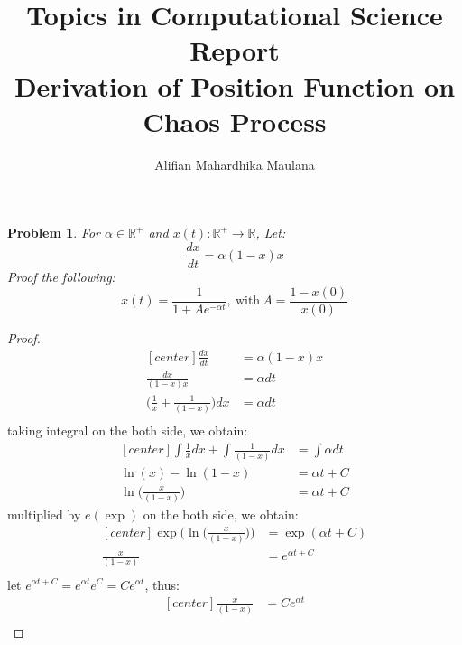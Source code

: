 \documentclass[a4paper,9pt]{article}
\title{Topics in Computational Science Report \\ Derivation of Position Function on Chaos Process}
\author{Alifian Mahardhika Maulana}
\newtheorem{prob}{Problem}
\newcommand{\R}{\mathbb{R}}
\begin{document}
\maketitle
\begin{prob}
	For $\alpha \in \R^+$ and $x(t) : \R^+ \rightarrow \R$, Let:
	\begin{equation}
	\frac{dx}{dt} = \alpha(1-x)x
	\end{equation}
	Proof the following:
	\begin{equation*}
	x(t) = \frac{1}{1+Ae^{-\alpha t}},\ \text{with}\ A=\frac{1-x(0)}{x(0)}
	\end{equation*}
\end{prob}
\begin{proof}
	\begin{equation*}
	\begin{aligned}[center]
		\frac{dx}{dt} &= \alpha(1-x)x\\
		\frac{dx}{(1-x)x} &= \alpha dt\\
		\bigg(\frac{1}{x} + \frac{1}{(1-x)}\bigg) dx &= \alpha dt\\
	\end{aligned}
	\end{equation*}
	taking integral on the both side, we obtain:
	\begin{equation*}
	\begin{aligned}[center]
	\int \frac{1}{x} dx + \int \frac{1}{(1-x)} dx &= \int \alpha dt\\
	\ln(x) - \ln(1-x) &= \alpha t + C\\
	\ln\bigg(\frac{x}{(1-x)}\bigg) &= \alpha t + C
	\end{aligned}
	\end{equation*}
	multiplied by $e(\exp)$ on the both side, we obtain:
	\begin{equation*}
	\begin{aligned}[center]
	\exp\bigg(\ln\bigg(\frac{x}{(1-x)}\bigg)\bigg) &= \exp(\alpha t + C)\\
	\frac{x}{(1-x)} &= e^{\alpha t + C}\\
	\end{aligned}
	\end{equation*}
	let $e^{\alpha t + C} = e^{\alpha t}e^{C}=Ce^{\alpha t}$, thus:
	\begin{equation}\label{eq:2}
	\begin{aligned}[center]
	\frac{x}{(1-x)} &= Ce^{\alpha t}\\
	\end{aligned}
	\end{equation}

\end{proof}
\end{document}

